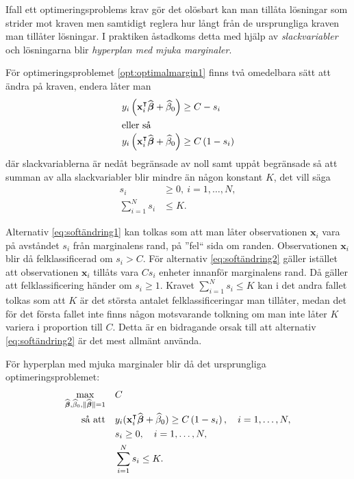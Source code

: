 \documentclass[a4paper, 12pt]{report}
\theoremstyle{definition}
\theoremstyle{remark}
\newcommand{\bfbeta}{{\boldsymbol{\beta}}}
\begin{document}
Ifall ett optimeringsproblems krav gör det olösbart kan man tillåta lösningar som strider mot kraven men samtidigt reglera hur långt från de ursprungliga kraven man tillåter lösningar. I praktiken åstadkoms detta med hjälp av \emph{slackvariabler} och lösningarna blir \emph{hyperplan med mjuka marginaler}.

För optimeringsproblemet \ref{opt:optimalmargin1} finns två omedelbara sätt att ändra på kraven, endera låter man
\begin{align}
	y_i\left(\mathbf{x}_i^\intercal\widehat{\bfbeta}+\widehat{\beta}_0\right) &\geq C-s_i\label{eq:softändring1}\\
	\intertext{eller så}
	y_i\left(\mathbf{x}_i^\intercal\widehat{\bfbeta}+\widehat{\beta}_0\right) &\geq C\left(1-s_i\right)\label{eq:softändring2}
\end{align}
där slackvariablerna är nedåt begränsade av noll samt uppåt begränsade så att summan av alla slackvariabler blir mindre än någon konstant $K$, det vill säga \begin{equation*}
\begin{aligned}
s_i&\geq0,~i=1,\dots,N,\\
\sum_{i=1}^{N}s_i&\leq K.
\end{aligned}
\end{equation*}

Alternativ \ref{eq:softändring1} kan tolkas som att man låter observationen $\mathbf{x}_i$ vara på avståndet $s_i$ från marginalens rand, på ''fel`` sida om randen. Observationen $\mathbf{x}_i$ blir då felklassificerad om $s_i>C$. För alternativ \ref{eq:softändring2} gäller istället att observationen $\mathbf{x}_i$ tillåts vara $Cs_i$ enheter innanför marginalens rand. Då gäller att felklassificering händer om $s_i\geq1$. Kravet $\sum_{i=1}^{N} s_i \leq K$ kan i det andra fallet tolkas som att $K$ är det största antalet felklassificeringar man tillåter, medan det för det första fallet inte finns någon motsvarande tolkning om man inte låter $K$ variera i proportion till $C$. Detta är en bidragande orsak till att alternativ \ref{eq:softändring2} är det mest allmänt använda.

För hyperplan med mjuka marginaler blir då det ursprungliga optimeringsproblemet:
\begin{equation}\label{opt:softmargin}
\begin{aligned}
\operatornamewithlimits{max}_{\widehat{\bfbeta},\widehat{\beta}_0,\|\widehat{\bfbeta}\|=1}& & &C\\
\text{så att}& & &y_i(\mathbf{x}_i^\intercal\widehat{\bfbeta}+\widehat{\beta}_0)\geq C\left(1-s_i\right),\quad i=1,\dots,N,\\
& & &s_i\geq0,\quad i=1,\dots,N,\\
& & &\sum_{i=1}^{N}s_i \leq K.
\end{aligned}
\end{equation}
\end{document}
